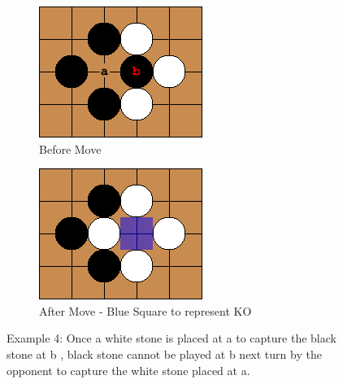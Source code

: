 \documentclass{l4proj}
\begin{document}
\begin{figure}[!ht]
\centering
\begin{subfigure}[b]{0.45\textwidth}
\centering
\includegraphics[width=\textwidth]{ex/Ex4-0.png}
\caption{Before Move}
\label{fig:ex4-0}
\end{subfigure}
\begin{subfigure}[b]{0.45\textwidth}
\centering
\includegraphics[width=\textwidth]{ex/Ex4-1.png}
\caption{After Move - Blue Square to represent KO}
\label{fig:ex4-1}
\end{subfigure}
\caption{Example 4: Once a white stone is placed at a to capture the black stone at b , black stone cannot be played at b next turn by the opponent to capture the white stone placed at a.}
\label{fig:ex4}
\end{figure}
\end{document}
